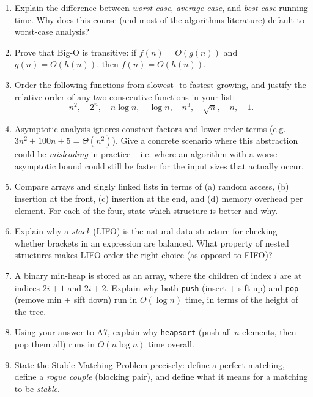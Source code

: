 \documentclass[11pt]{article}
\begin{document}
\begin{enumerate}[label=\textbf{A\arabic*.}, leftmargin=2.2em]

\item Explain the difference between \emph{worst-case}, \emph{average-case}, and
\emph{best-case} running time. Why does this course (and most of the algorithms
literature) default to worst-case analysis?

\item Prove that Big-O is transitive: if $f(n) = O(g(n))$ and $g(n) = O(h(n))$, then
$f(n) = O(h(n))$.

\item Order the following functions from slowest- to fastest-growing, and justify the
relative order of any two consecutive functions in your list:
\[
  n^2, \quad 2^n, \quad n\log n, \quad \log n, \quad n^3, \quad \sqrt{n}, \quad n, \quad 1.
\]

\item Asymptotic analysis ignores constant factors and lower-order terms (e.g. $3n^2 +
100n + 5 = \Theta(n^2)$). Give a concrete scenario where this abstraction could be
\emph{misleading} in practice -- i.e. where an algorithm with a worse asymptotic bound
could still be faster for the input sizes that actually occur.

\item Compare arrays and singly linked lists in terms of (a) random access, (b) insertion
at the front, (c) insertion at the end, and (d) memory overhead per element. For each of
the four, state which structure is better and why.

\item Explain why a \emph{stack} (LIFO) is the natural data structure for checking
whether brackets in an expression are balanced. What property of nested structures makes
LIFO order the right choice (as opposed to FIFO)?

\item A binary min-heap is stored as an array, where the children of index $i$ are at
indices $2i+1$ and $2i+2$. Explain why both \texttt{push} (insert + sift up) and
\texttt{pop} (remove min + sift down) run in $O(\log n)$ time, in terms of the height of
the tree.

\item Using your answer to A7, explain why \texttt{heapsort} (push all $n$ elements, then
pop them all) runs in $O(n \log n)$ time overall.

\item State the Stable Matching Problem precisely: define a perfect matching, define a
\emph{rogue couple} (blocking pair), and define what it means for a matching to be
\emph{stable}.


\end{enumerate}
\end{document}
